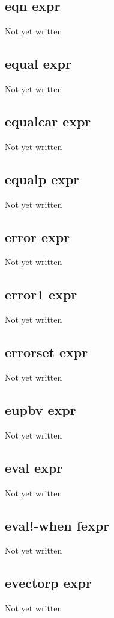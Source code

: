 \documentclass[a4paper,11pt]{article}
\begin{document}
\subsection{\ttfamily eqn expr}
Not yet written

\subsection{\ttfamily equal expr}
Not yet written

\subsection{\ttfamily equalcar expr}
Not yet written

\subsection{\ttfamily equalp expr}
Not yet written

\subsection{\ttfamily error expr}
Not yet written

\subsection{\ttfamily error1 expr}
Not yet written

\subsection{\ttfamily errorset expr}
Not yet written

\subsection{\ttfamily eupbv expr}
Not yet written

\subsection{\ttfamily eval expr}
Not yet written

\subsection{\ttfamily eval!-when fexpr}
Not yet written

\subsection{\ttfamily evectorp expr}
Not yet written
\end{document}

